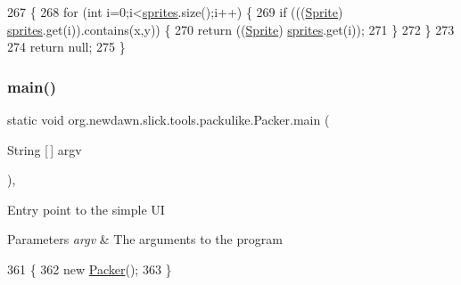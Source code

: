 \begin{DoxyCode}
267                                             \{
268         \textcolor{keywordflow}{for} (\textcolor{keywordtype}{int} i=0;i<\mbox{\hyperlink{classorg_1_1newdawn_1_1slick_1_1tools_1_1packulike_1_1_packer_a5684e96219ce89e574c4550d3c650eaa}{sprites}}.size();i++) \{
269             \textcolor{keywordflow}{if} (((\mbox{\hyperlink{class_sprite}{Sprite}}) \mbox{\hyperlink{classorg_1_1newdawn_1_1slick_1_1tools_1_1packulike_1_1_packer_a5684e96219ce89e574c4550d3c650eaa}{sprites}}.get(i)).contains(x,y)) \{
270                 \textcolor{keywordflow}{return} ((\mbox{\hyperlink{class_sprite}{Sprite}}) \mbox{\hyperlink{classorg_1_1newdawn_1_1slick_1_1tools_1_1packulike_1_1_packer_a5684e96219ce89e574c4550d3c650eaa}{sprites}}.get(i));
271             \}
272         \}
273         
274         \textcolor{keywordflow}{return} null;
275     \}
\end{DoxyCode}
\mbox{\label{classorg_1_1newdawn_1_1slick_1_1tools_1_1packulike_1_1_packer_ab4b9f50874989c58b4f344f9747fd04d}} 
\subsubsection{\texorpdfstring{main()}{main()}}
{\footnotesize\ttfamily static void org.\+newdawn.\+slick.\+tools.\+packulike.\+Packer.\+main (\begin{DoxyParamCaption}\item[{String \mbox{[}$\,$\mbox{]}}]{argv }\end{DoxyParamCaption})\hspace{0.3cm}{\ttfamily [inline]}, {\ttfamily [static]}}

Entry point to the simple UI


\begin{DoxyParams}{Parameters}
{\em argv} & The arguments to the program \\
\hline
\end{DoxyParams}

\begin{DoxyCode}
361                                            \{
362         \textcolor{keyword}{new} \mbox{\hyperlink{classorg_1_1newdawn_1_1slick_1_1tools_1_1packulike_1_1_packer_aea273a706568d7f6e6621a38d3ad694d}{Packer}}();
363     \}
\end{DoxyCode}
\mbox{\label{classorg_1_1newdawn_1_1slick_1_1tools_1_1packulike_1_1_packer_a7350e349de07dff645d4e146eef9f100}} 
